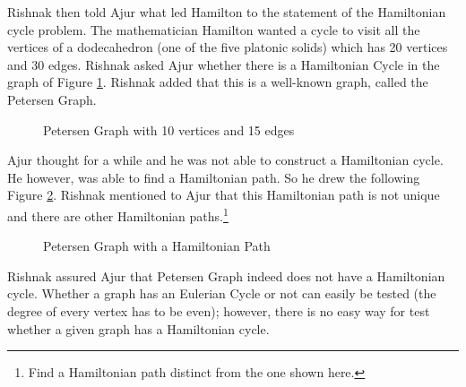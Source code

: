 Rishnak then told Ajur what led Hamilton to the statement of the Hamiltonian cycle problem. The mathematician Hamilton wanted a cycle to visit 
all the vertices of a dodecahedron (one of the five platonic solids) which has 20 vertices and 30 edges. 
Rishnak asked Ajur whether there is a Hamiltonian Cycle in the graph of Figure \ref{5g3}. Rishnak added that this is a well-known graph, called the Petersen Graph.

\begin{figure}
\begin{center}
\caption{ Petersen Graph with 10 vertices and 15 edges }\label{5g3}
\end{center}
\end{figure}
Ajur thought for a while and he was not able to construct a Hamiltonian cycle. He however, was able to find a 
Hamiltonian path. So he drew the following Figure \ref{5g4}. Rishnak mentioned to Ajur that this Hamiltonian path is not unique and there are other Hamiltonian paths.\footnote{Find a Hamiltonian path distinct from the one shown here.}


\begin{figure}
\begin{center}
\caption{ Petersen Graph with a Hamiltonian Path}\label{5g4}
\end{center}
\end{figure}
Rishnak assured Ajur that Petersen Graph indeed does not have a Hamiltonian cycle. Whether a graph has an Eulerian Cycle or not can easily be tested (the degree of every vertex has to be even); however, there is no easy way for test whether a given graph has a Hamiltonian cycle. 

